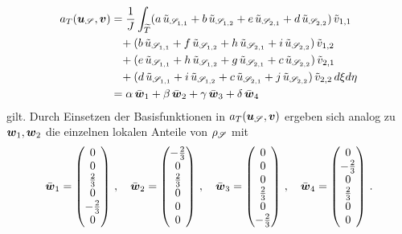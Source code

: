 \begin{align*}
	a_T(\boldsymbol u_{\mathscr S},\boldsymbol v) & = \frac 1J \int_{\widetilde T} (a\, \tilde u_{\mathscr S_{1,1}} + b \, \tilde u_{\mathscr S_{1,2}} + e \, \tilde u_{\mathscr S_{2,1}} + d \, \tilde u_{\mathscr S_{2,2}}) \, \tilde v_{1,1} \\
	& \ \ \, + (b\, \tilde u_{\mathscr S_{1,1}} + f \, \tilde u_{\mathscr S_{1,2}} + h \, \tilde u_{\mathscr S_{2,1}} + i \, \tilde u_{\mathscr S_{2,2}}) \, \tilde v_{1,2} \\
	& \ \ \, +(e\, \tilde u_{\mathscr S_{1,1}} + h \, \tilde u_{\mathscr S_{1,2}} + g \, \tilde u_{\mathscr S_{2,1}} + c \, \tilde u_{\mathscr S_{2,2}}) \, \tilde v_{2,1} \\
	& \ \ \, +(d\, \tilde u_{\mathscr S_{1,1}} + i \, \tilde u_{\mathscr S_{1,2}} + c \, \tilde u_{\mathscr S_{2,1}} + j \, \tilde u_{\mathscr S_{2,2}}) \, \tilde v_{2,2} \, d \xi d\eta  \\
	& = \alpha \, \bar {\boldsymbol w}_1 + \beta \, \bar {\boldsymbol w}_2 + \gamma \, \bar {\boldsymbol w}_3 + \delta\, \bar {\boldsymbol w}_4
\end{align*}
gilt. Durch Einsetzen der Basisfunktionen in $a_T(\boldsymbol u_{\mathscr S},\boldsymbol v)$ ergeben sich analog zu $\boldsymbol w_1, \boldsymbol w_2$ die einzelnen lokalen Anteile von $\rho_{\mathscr S}$ mit
\[
	\bar{\boldsymbol w}_1 = \begin{pmatrix}
					0 \\ 0 \\ \frac 23 \\ 0 \\ -\frac 23 \\ 0
				\end{pmatrix} \, , \quad
	\bar{\boldsymbol w}_2 = \begin{pmatrix}
					-\frac 23 \\ 0 \\ \frac 23 \\ 0 \\ 0 \\ 0
				\end{pmatrix} \, , \quad
	\bar{\boldsymbol w}_3 = \begin{pmatrix}
					0 \\ 0 \\ 0 \\ \frac 23 \\ 0  \\  -\frac 23 
				\end{pmatrix} \, , \quad
	\bar{\boldsymbol w}_4 = \begin{pmatrix}
					0 \\ -\frac 23 \\ 0 \\ \frac 23 \\ 0 \\ 0
				\end{pmatrix} \, .											
\]


